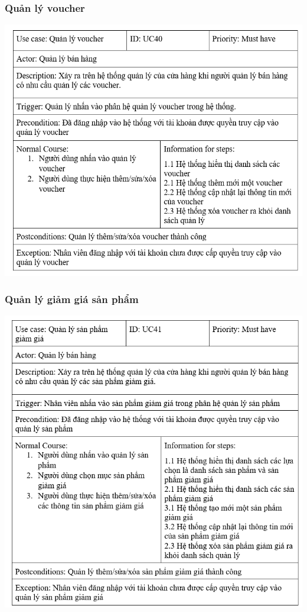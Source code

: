 \documentclass[12pt,a4paper,2sides]{report}
\begin{document}
\subsubsection{Quản lý voucher}
    \includegraphics[width=1\linewidth]{lib/usecase/quanlyvoucher.png}\\\vspace*{1cm} 
\subsubsection{Quản lý giảm giá sản phẩm}
    \includegraphics[width=1\linewidth]{lib/usecase/quanlyspgiamgia.png}\\\vspace*{1cm} 
\end{document}
